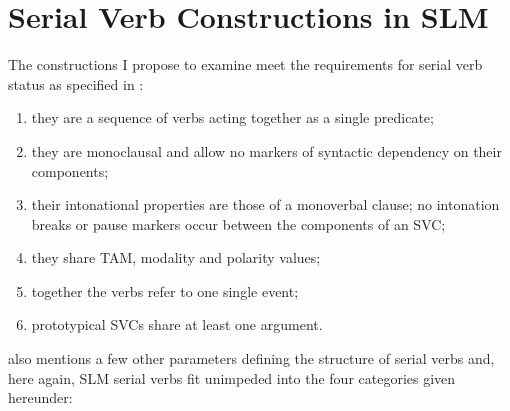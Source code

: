 \section{Serial Verb Constructions in SLM}

The constructions I propose to examine meet the requirements for serial verb status as specified in \citet{Aikhenvald2006}: 

\begin{enumerate} 
\item they are a sequence of verbs acting together as a single predicate;
\item they are monoclausal and allow no markers of syntactic dependency on their components;
\item their intonational properties are those of a monoverbal clause; no intonation breaks or pause markers occur between the components of an SVC;
\item they share TAM, modality and polarity values;
\item together the verbs refer to one single event;
\item prototypical SVCs share at least one argument.
\end{enumerate}

\citet{Aikhenvald2006} also mentions a few other parameters defining the structure of serial verbs and, here again, SLM serial verbs fit unimpeded into the four categories given hereunder:


